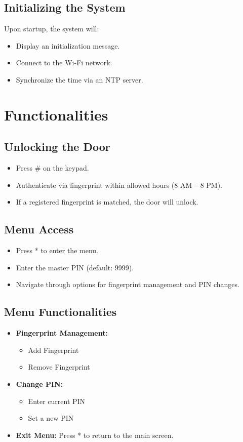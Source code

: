 \documentclass[a4paper,12pt]{article}
\begin{document}
\subsection{Initializing the System}
Upon startup, the system will:
\begin{itemize}
    \item Display an initialization message.
    \item Connect to the Wi-Fi network.
    \item Synchronize the time via an NTP server.
\end{itemize}

\section{Functionalities}
\subsection{Unlocking the Door}
\begin{itemize}
    \item Press \# on the keypad.
    \item Authenticate via fingerprint within allowed hours (8 AM – 8 PM).
    \item If a registered fingerprint is matched, the door will unlock.
\end{itemize}

\subsection{Menu Access}
\begin{itemize}
    \item Press * to enter the menu.
    \item Enter the master PIN (default: 9999).
    \item Navigate through options for fingerprint management and PIN changes.
\end{itemize}

\subsection{Menu Functionalities}
\begin{itemize}
    \item \textbf{Fingerprint Management:}
    \begin{itemize}
        \item Add Fingerprint
        \item Remove Fingerprint
    \end{itemize}
    \item \textbf{Change PIN:}
    \begin{itemize}
        \item Enter current PIN
        \item Set a new PIN
    \end{itemize}
    \item \textbf{Exit Menu:} Press * to return to the main screen.
\end{itemize}
\end{document}
